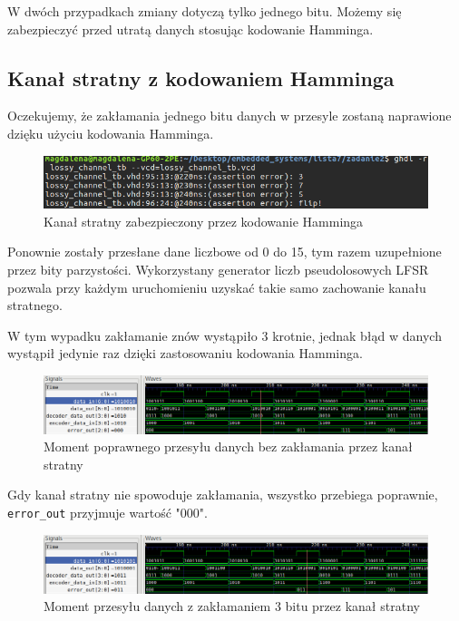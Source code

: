 \documentclass[a4paper,11pt]{article}
\begin{document}
{			W dwóch przypadkach zmiany dotyczą tylko jednego bitu. Możemy się zabezpieczyć przed utratą danych stosując kodowanie Hamminga.
			
			\subsection{Kanał stratny z kodowaniem Hamminga}
			
			Oczekujemy, że zakłamania jednego bitu danych w przesyle zostaną naprawione dzięku użyciu kodowania Hamminga.
			
			\begin{figure}[H]
				\centering
				\includegraphics[width=16cm]{ham_terminal}
				\caption{Kanał stratny zabezpieczony przez kodowanie Hamminga}
			\end{figure}
			
			Ponownie zostały przesłane dane liczbowe od 0 do 15, tym razem uzupełnione przez bity parzystości. Wykorzystany generator liczb pseudolosowych LFSR pozwala przy każdym uruchomieniu uzyskać takie samo zachowanie kanału stratnego.
			
			W tym wypadku zakłamanie znów wystąpiło 3 krotnie, jednak błąd w danych wystąpił jedynie raz dzięki zastosowaniu kodowania Hamminga.
			
			\begin{figure}[H]
				\centering
				\includegraphics[width=\textwidth]{ham_gtk4}
				\caption{Moment poprawnego przesyłu danych bez zakłamania przez kanał stratny}
			\end{figure}
			
			Gdy kanał stratny nie spowoduje zakłamania, wszystko przebiega poprawnie, \texttt{error\_out} przyjmuje wartość "000".
			
			\begin{figure}[H]
				\centering
				\includegraphics[width=\textwidth]{ham_gtk}
				\caption{Moment przesyłu danych z zakłamaniem 3 bitu przez kanał stratny}
			\end{figure}
			
}
\end{document}
